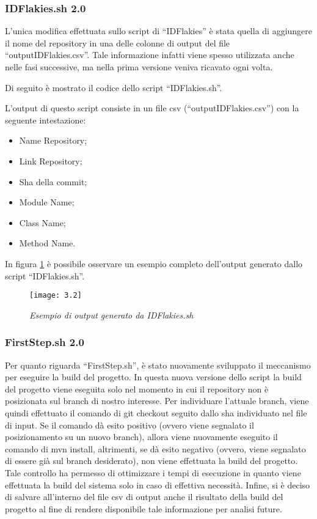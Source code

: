 \subsubsection{IDFlakies.sh 2.0}
L’unica modifica effettuata sullo script di “IDFlakies” è stata quella di aggiungere il nome del repository in una delle colonne di output del file “outputIDFlakies.csv”. Tale informazione infatti viene spesso utilizzata anche nelle fasi successive, ma nella prima versione veniva ricavato ogni volta.

Di seguito è mostrato il codice dello script “IDFlakies.sh”.


L’output di questo script consiste in un file csv (“outputIDFlakies.csv”) con la seguente intestazione:
\begin{itemize}
	\item Name Repository;
	\item Link Repository;
	\item Sha della commit;
	\item Module Name;
	\item Class Name;
	\item Method Name.
\end{itemize}

In figura \ref{fig:outputIDFlakies} è possibile osservare un esempio completo dell’output generato dallo script “IDFlakies.sh”.
\newpage
\begin{figure}[h]
	\centering
	\texttt{[image: 3.2]}
	\caption{\emph{Esempio di output generato da IDFlakies.sh}}
	\label{fig:outputIDFlakies}
\end{figure}
\subsubsection{FirstStep.sh 2.0}
Per quanto riguarda “FirstStep.sh”, è stato nuovamente sviluppato il
meccanismo per eseguire la build del progetto. In questa nuova versione dello script la build del progetto viene eseguita solo nel momento in cui il repository non è posizionata sul branch di nostro interesse. Per individuare l’attuale branch, viene quindi effettuato il comando di git checkout seguito dallo sha individuato nel file di
input. Se il comando dà esito positivo (ovvero viene segnalato il posizionamento su un nuovo branch), allora viene nuovamente eseguito il comando di mvn install, altrimenti, se dà esito negativo (ovvero, viene segnalato di essere già sul branch desiderato), non viene effettuata la build del progetto. Tale controllo ha permesso
di ottimizzare i tempi di esecuzione in quanto viene effettuata la build del sistema solo in caso di effettiva necessità. Infine, si è deciso di salvare all’interno del file csv di output anche il risultato della build del progetto al fine di rendere disponibile
tale informazione per analisi future.

